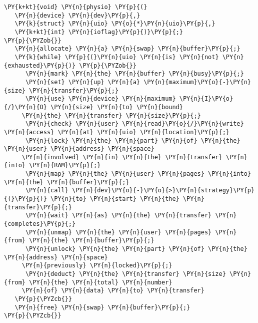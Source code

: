 \begin{Verbatim}[commandchars=\\\{\}]
\PY{k+kt}{void} \PY{n}{physio} \PY{p}{(}
   \PY{n}{device} \PY{n}{dev}\PY{p}{,}
   \PY{k}{struct} \PY{n}{uio} \PY{o}{*}\PY{n}{uio}\PY{p}{,}
   \PY{k+kt}{int} \PY{n}{ioflag}\PY{p}{)}\PY{p}{;}
\PY{p}{\PYZob{}}
   \PY{n}{allocate} \PY{n}{a} \PY{n}{swap} \PY{n}{buffer}\PY{p}{;}
   \PY{k}{while} \PY{p}{(}\PY{n}{uio} \PY{n}{is} \PY{n}{not} \PY{n}{exhausted}\PY{p}{)} \PY{p}{\PYZob{}}
      \PY{n}{mark} \PY{n}{the} \PY{n}{buffer} \PY{n}{busy}\PY{p}{;}
      \PY{n}{set} \PY{n}{up} \PY{n}{a} \PY{n}{maximum}\PY{o}{-}\PY{n}{size} \PY{n}{transfer}\PY{p}{;}
      \PY{n}{use} \PY{n}{device} \PY{n}{maximum} \PY{n}{I}\PY{o}{/}\PY{n}{O} \PY{n}{size} \PY{n}{to} \PY{n}{bound}
	 \PY{n}{the} \PY{n}{transfer} \PY{n}{size}\PY{p}{;}
      \PY{n}{check} \PY{n}{user} \PY{n}{read}\PY{o}{/}\PY{n}{write} \PY{n}{access} \PY{n}{at} \PY{n}{uio} \PY{n}{location}\PY{p}{;}
      \PY{n}{lock} \PY{n}{the} \PY{n}{part} \PY{n}{of} \PY{n}{the} \PY{n}{user} \PY{n}{address} \PY{n}{space}
	 \PY{n}{involved} \PY{n}{in} \PY{n}{the} \PY{n}{transfer} \PY{n}{into} \PY{n}{RAM}\PY{p}{;}
      \PY{n}{map} \PY{n}{the} \PY{n}{user} \PY{n}{pages} \PY{n}{into} \PY{n}{the} \PY{n}{buffer}\PY{p}{;}
      \PY{n}{call} \PY{n}{dev}\PY{o}{-}\PY{o}{>}\PY{n}{strategy}\PY{p}{(}\PY{p}{)} \PY{n}{to} \PY{n}{start} \PY{n}{the} \PY{n}{transfer}\PY{p}{;}
      \PY{n}{wait} \PY{n}{as} \PY{n}{the} \PY{n}{transfer} \PY{n}{completes}\PY{p}{;}
      \PY{n}{unmap} \PY{n}{the} \PY{n}{user} \PY{n}{pages} \PY{n}{from} \PY{n}{the} \PY{n}{buffer}\PY{p}{;}
      \PY{n}{unlock} \PY{n}{the} \PY{n}{part} \PY{n}{of} \PY{n}{the} \PY{n}{address} \PY{n}{space}
	 \PY{n}{previously} \PY{n}{locked}\PY{p}{;}
      \PY{n}{deduct} \PY{n}{the} \PY{n}{transfer} \PY{n}{size} \PY{n}{from} \PY{n}{the} \PY{n}{total} \PY{n}{number}
	 \PY{n}{of} \PY{n}{data} \PY{n}{to} \PY{n}{transfer}
   \PY{p}{\PYZcb{}}
   \PY{n}{free} \PY{n}{swap} \PY{n}{buffer}\PY{p}{;}
\PY{p}{\PYZcb{}}
\end{Verbatim}
